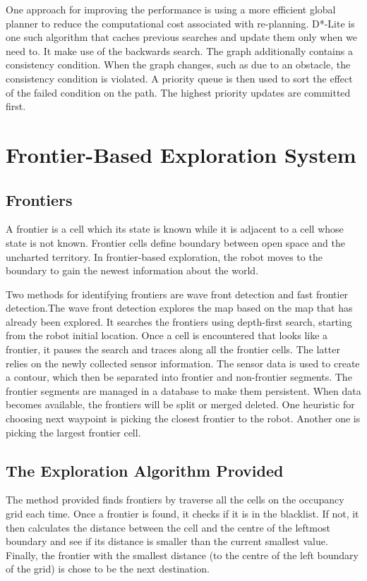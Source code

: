 \documentclass{article}
\begin{document}
One approach for improving the performance is using a more efficient global planner to reduce the computational cost associated with re-planning. D*-Lite is one such algorithm that caches previous searches and update them only when we need to. It make use of the backwards search. The graph additionally contains a consistency condition. When the graph changes, such as due to an obstacle, the consistency condition is violated. A priority queue is then used to sort the effect of the failed condition on the path. The highest priority updates are committed first.

\pagebreak
\section{Frontier-Based Exploration System}
\subsection {Frontiers}

A frontier is a cell which its state is known while it is adjacent to a cell whose state is not known. Frontier cells define boundary between open space and the uncharted territory. In frontier-based exploration, the robot moves to the boundary to gain the newest information about the world.

Two methods for identifying frontiers are wave front detection and fast frontier detection.The wave front detection explores the map based on the map that has already been explored. It searches the frontiers using depth-first search, starting from the robot initial location. Once a cell is encountered that looks like a frontier, it pauses the search and traces along all the frontier cells. The latter relies on the newly collected sensor information. The sensor data is used to create a contour, which then be separated into frontier and non-frontier segments. The frontier segments are managed in a database to make them persistent. When data becomes available, the frontiers will be split or merged deleted. One heuristic for choosing next waypoint is picking the closest frontier to the robot. Another one is picking the largest frontier cell.

\subsection {The Exploration Algorithm Provided}
The method provided finds frontiers by traverse all the cells on the occupancy grid each time. Once a frontier is found, it checks if it is in the blacklist. If not, it then calculates the distance between the cell and the centre of the leftmost boundary and see if its distance is smaller than the current smallest value.  Finally, the frontier with the smallest distance (to the centre of the left boundary of the grid) is chose to be the next destination.  
\end{document}
